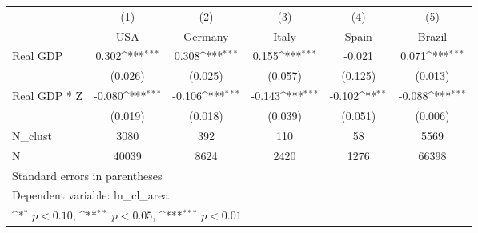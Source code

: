 {
\def\sym#1{\ifmmode^{#1}\else\(^{#1}\)\fi}
\begin{tabular}{l*{5}{c}}
\hline\hline
            &\multicolumn{1}{c}{(1)}&\multicolumn{1}{c}{(2)}&\multicolumn{1}{c}{(3)}&\multicolumn{1}{c}{(4)}&\multicolumn{1}{c}{(5)}\\
            &\multicolumn{1}{c}{USA}&\multicolumn{1}{c}{Germany}&\multicolumn{1}{c}{Italy}&\multicolumn{1}{c}{Spain}&\multicolumn{1}{c}{Brazil}\\
\hline
Real GDP    &       0.302\sym{***}&       0.308\sym{***}&       0.155\sym{***}&      -0.021         &       0.071\sym{***}\\
            &     (0.026)         &     (0.025)         &     (0.057)         &     (0.125)         &     (0.013)         \\
[1em]
Real GDP * Z&      -0.080\sym{***}&      -0.106\sym{***}&      -0.143\sym{***}&      -0.102\sym{**} &      -0.088\sym{***}\\
            &     (0.019)         &     (0.018)         &     (0.039)         &     (0.051)         &     (0.006)         \\
\hline
N\_clust     &        3080         &         392         &         110         &          58         &        5569         \\
N           &       40039         &        8624         &        2420         &        1276         &       66398         \\
\hline\hline
\multicolumn{6}{l}{\footnotesize Standard errors in parentheses}\\
\multicolumn{6}{l}{\footnotesize Dependent variable: ln\_cl\_area}\\
\multicolumn{6}{l}{\footnotesize \sym{*} \(p<0.10\), \sym{**} \(p<0.05\), \sym{***} \(p<0.01\)}\\
\end{tabular}
}
